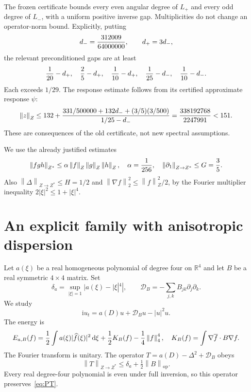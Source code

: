 \documentclass[11pt,a4paper]{article}
\theoremstyle{remark}\newtheorem{remark}[theorem]{Remark}
\newcommand{\R}{\mathbb R}\newcommand{\C}{\mathbb C}
\newcommand{\ii}{\mathrm i}\newcommand{\dd}{\,\mathrm d}
\newcommand{\norm}[1]{\left\|#1\right\|}
\begin{document}
The frozen certificate bounds every even angular degree of $L_+$ and every odd degree of $L_-$, with a uniform positive inverse gap. Multiplicities do not change an operator-norm bound. Explicitly, putting
\[
 d_-={312009\over64000000},\qquad d_+=3d_-,
\]
the relevant preconditioned gaps are at least
\[
 {1\over20}-d_+,\quad {2\over5}-d_+,\quad
 {1\over10}-d_+,\quad {1\over25}-d_-,\quad {1\over10}-d_-.
\]
Each exceeds $1/29$. The response estimate follows from its certified approximate response $\psi$:
\[
 \norm z_Z\le132+
 {331/500000+132d_-+(3/5)(3/500)\over 1/25-d_-}
 ={338192768\over2247991}<151.
\]
These are consequences of the old certificate, not new spectral assumptions.

We use the already justified estimates
\begin{equation}\label{eq:norms}
 \norm{fgh}_{Z^*}\le\alpha\norm f_Z\norm g_Z\norm h_Z,
 \quad\alpha={1\over256},\quad
 \norm{\partial_1}_{Z\to Z^*}\le G={3\over5}.
\end{equation}
Also $\norm{\Delta}_{Z\to Z^*}\le H=1/2$ and
$\norm{\nabla f}_2^2\le\norm f_Z^2/2$, by the Fourier multiplier inequality
$2|\xi|^2\le1+|\xi|^4$.

\section{An explicit family with anisotropic dispersion}
Let $a(\xi)$ be a real homogeneous polynomial of degree four on $\R^4$ and let $B$ be a real symmetric $4\times4$ matrix. Set
\[
 \delta_a=\sup_{|\xi|=1}|a(\xi)-|\xi|^4|,
 \qquad \mathcal D_B=-\sum_{j,k}B_{jk}\partial_j\partial_k.
\]
We study
\begin{equation}\label{eq:general}
 \ii u_t=a(D)u+\mathcal D_Bu-|u|^2u.
\end{equation}
The energy is
\[
 E_{a,B}(f)={1\over2}\int a(\xi)|\widehat f(\xi)|^2\dd\xi
 +{1\over2}K_B(f)-{1\over4}\norm f_4^4,
\quad K_B(f)=\int\nabla\overline f\cdot B\nabla f.
\]
The Fourier transform is unitary. The operator
$T=a(D)-\Delta^2+\mathcal D_B$ obeys
\begin{equation}\label{eq:Tnorm}
 \norm T_{Z\to Z^*}\le\delta_a+\tfrac12\norm B_{\mathrm{op}}.
\end{equation}
Every real degree-four polynomial is even under full inversion, so this operator preserves~\eqref{eq:PT}.
\end{document}
